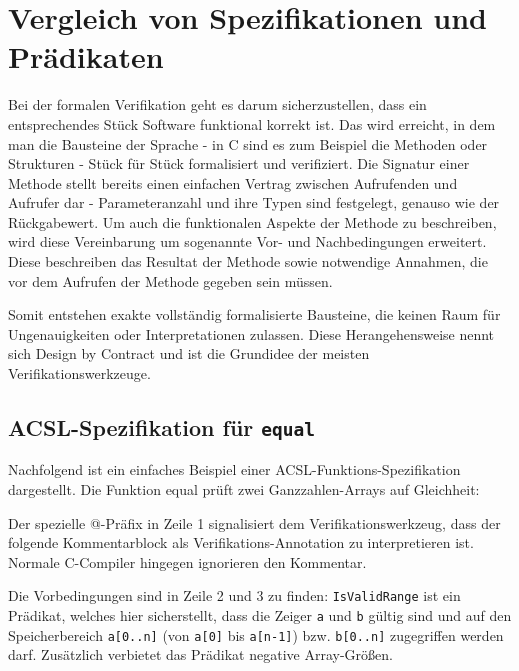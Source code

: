 ﻿\chapter{Vergleich von Spezifikationen und Prädikaten}
\label{sec:design-by-contract}

Bei der formalen Verifikation geht es darum sicherzustellen, dass ein entsprechendes Stück Software
funktional korrekt ist. Das wird erreicht, in dem man die Bausteine der Sprache - in C sind es zum Beispiel die Methoden 
oder Strukturen -
Stück für Stück formalisiert und verifiziert. Die Signatur einer Methode stellt bereits einen einfachen Vertrag zwischen
Aufrufenden und Aufrufer dar - Parameteranzahl und ihre Typen sind festgelegt, genauso wie der Rückgabewert.
Um auch die funktionalen Aspekte der Methode zu beschreiben, wird diese Vereinbarung um sogenannte Vor- und Nachbedingungen erweitert.
Diese beschreiben das Resultat der Methode sowie notwendige Annahmen, die vor dem Aufrufen der Methode gegeben sein müssen. 

Somit entstehen exakte vollständig formalisierte Bausteine, die keinen Raum für Ungenauigkeiten oder Interpretationen zulassen.
Diese Herangehensweise nennt sich Design by Contract und ist die Grundidee der meisten Verifikationswerkzeuge.



\section{ACSL-Spezifikation für \texttt{equal}}
\label{sec:design-by-contract:acsl-spezifikation}

Nachfolgend ist ein einfaches Beispiel einer ACSL-Funktions-Spezifikation dargestellt.
Die Funktion equal prüft zwei Ganzzahlen-Arrays auf Gleichheit:



Der spezielle @-Präfix in Zeile 1 signalisiert dem Verifikationswerkzeug, 
dass der folgende Kommentarblock als Verifikations-Annotation zu interpretieren ist. Normale C-Compiler hingegen
ignorieren den Kommentar.

Die Vorbedingungen sind in Zeile 2 und 3 zu finden: \lstinline{IsValidRange} ist ein Prädikat, welches hier sicherstellt,
dass die Zeiger \lstinline{a} und \lstinline{b} gültig sind und auf den Speicherbereich \lstinline{a[0..n]} 
(von \lstinline{a[0]} bis \lstinline{a[n-1]}) bzw. \lstinline{b[0..n]} zugegriffen 
werden darf. Zusätzlich verbietet das Prädikat negative Array-Größen.

